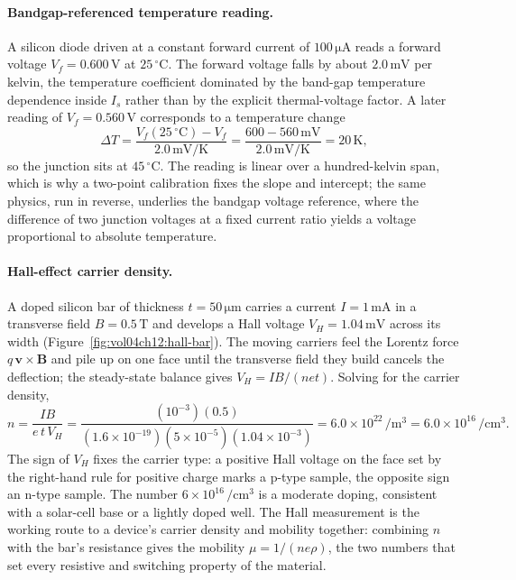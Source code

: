 \paragraph{Bandgap-referenced temperature reading.}
A silicon diode driven at a constant forward current of $100\,\si{
\micro\ampere}$ reads a forward voltage $V_{f} = 0.600\,\si{\volt}$ at
$25\,{}^{\circ}\mathrm{C}$. The forward voltage falls by about
$2.0\,\si{\milli\volt}$ per kelvin, the temperature coefficient
dominated by the band-gap temperature dependence inside $I_{s}$ rather
than by the explicit thermal-voltage factor. A later reading of
$V_{f} = 0.560\,\si{\volt}$ corresponds to a temperature change
\[
\Delta T = \frac{V_{f}(25\,{}^{\circ}\mathrm{C}) - V_{f}}{2.0\,\si{
\milli\volt\per\kelvin}}
= \frac{600 - 560\,\si{\milli\volt}}{2.0\,\si{\milli\volt\per\kelvin}}
= 20\,\si{\kelvin},
\]
so the junction sits at $45\,{}^{\circ}\mathrm{C}$. The reading is
linear over a hundred-kelvin span, which is why a two-point calibration
fixes the slope and intercept; the same physics, run in reverse,
underlies the bandgap voltage reference, where the difference of two
junction voltages at a fixed current ratio yields a voltage
proportional to absolute temperature.

\paragraph{Hall-effect carrier density.}
A doped silicon bar of thickness $t = 50\,\si{\micro\meter}$ carries a
current $I = 1\,\si{\milli\ampere}$ in a transverse field $B = 0.5\,\si{
\tesla}$ and develops a Hall voltage $V_{H} = 1.04\,\si{\milli\volt}$
across its width (Figure~\ref{fig:vol04ch12:hall-bar}). The moving
carriers feel the Lorentz force $q\,\mathbf{v}\times\mathbf{B}$ and pile
up on one face until the transverse field they build cancels the
deflection; the steady-state balance gives $V_{H} = I B/(n e t)$.
Solving for the carrier density,
\[
n = \frac{I B}{e\,t\,V_{H}}
= \frac{(10^{-3})(0.5)}{(1.6\times 10^{-19})(5\times 10^{-5})(1.04\times
10^{-3})}
= 6.0\times 10^{22}\,\si{\per\meter\cubed}
= 6.0\times 10^{16}\,\si{\per\centi\meter\cubed}.
\]
The sign of $V_{H}$ fixes the carrier type: a positive Hall voltage on
the face set by the right-hand rule for positive charge marks a p-type
sample, the opposite sign an n-type sample. The number $6\times 10^{16}
\,\si{\per\centi\meter\cubed}$ is a moderate doping, consistent with a
solar-cell base or a lightly doped well. The Hall measurement is the
working route to a device's carrier density and mobility together:
combining $n$ with the bar's resistance gives the mobility $\mu =
1/(n e \rho)$, the two numbers that set every resistive and switching
property of the material.


